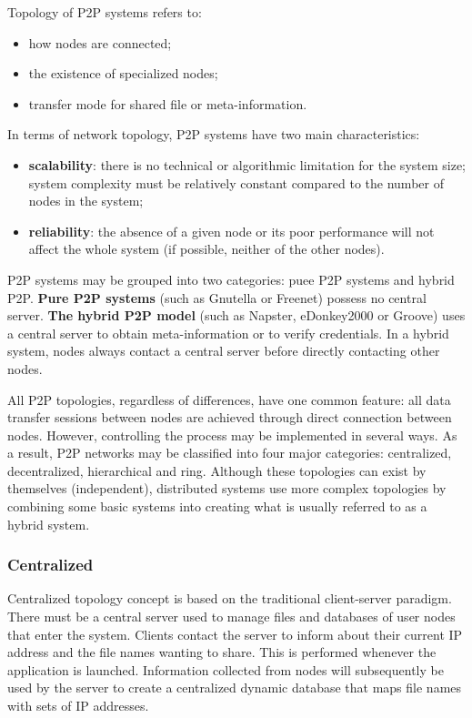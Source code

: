 Topology of P2P systems refers to:
\begin{itemize}
  \item how nodes are connected;
  \item the existence of specialized nodes;
  \item transfer mode for shared file or meta-information.
\end{itemize}

In terms of network topology, P2P systems have two main characteristics:

\begin{itemize}
  \item \textbf{scalability}: there is no technical or algorithmic limitation
  for the system size; system complexity must be relatively constant compared
  to the number of nodes in the system;
  \item \textbf{reliability}: the absence of a given node or its poor
  performance will not affect the whole system (if possible, neither of the
  other nodes).
\end{itemize}

P2P systems may be grouped into two categories: puee P2P systems and hybrid
P2P. \textbf{Pure P2P systems} (such as Gnutella or Freenet) possess no
central server. \textbf{The hybrid P2P model} (such as Napster, eDonkey2000 or
Groove) uses a central server to obtain meta-information or to verify
credentials. In a hybrid system, nodes always contact a central server before
directly contacting other nodes.

All P2P topologies, regardless of differences, have one common feature: all
data transfer sessions between nodes are achieved through direct connection
between nodes. However, controlling the process may be implemented in several
ways. As a result, P2P networks may be classified into four major categories:
centralized, decentralized, hierarchical and ring. Although these topologies
can exist by themselves (independent), distributed systems use more complex
topologies by combining some basic systems into creating what is usually
referred to as a hybrid system.

\subsubsection{Centralized}

Centralized topology concept is based on the traditional client-server
paradigm. There must be a central server used to manage files and databases
of user nodes that enter the system. Clients contact the server to
inform about their current IP address and the file names wanting to share.
This is performed whenever the application is launched. Information collected
from nodes will subsequently be used by the server to create a centralized
dynamic database that maps file names with sets of IP addresses.

